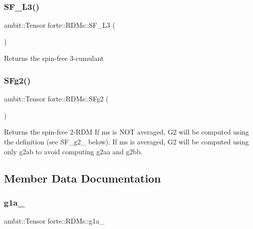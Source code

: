 \subsubsection{\texorpdfstring{S\+F\+\_\+\+L3()}{SF\_L3()}}
{\footnotesize\ttfamily ambit\+::\+Tensor forte\+::\+R\+D\+Ms\+::\+S\+F\+\_\+\+L3 (\begin{DoxyParamCaption}{ }\end{DoxyParamCaption})}

\begin{DoxyReturn}{Returns}
the spin-\/free 3-\/cumulant 
\end{DoxyReturn}
\mbox{\label{classforte_1_1_r_d_ms_a243bc245d6f69251fa4d4c39b895e19a}} 
\subsubsection{\texorpdfstring{S\+Fg2()}{SFg2()}}
{\footnotesize\ttfamily ambit\+::\+Tensor forte\+::\+R\+D\+Ms\+::\+S\+Fg2 (\begin{DoxyParamCaption}{ }\end{DoxyParamCaption})}

\begin{DoxyReturn}{Returns}
the spin-\/free 2-\/\+R\+DM If ms is N\+OT averaged, G2 will be computed using the definition (see S\+F\+\_\+g2\+\_\+ below). If ms is averaged, G2 will be computed using only g2ab to avoid computing g2aa and g2bb. 
\end{DoxyReturn}


\subsection{Member Data Documentation}
\mbox{\label{classforte_1_1_r_d_ms_af227a87cddd7ef6a1acfee7c797ee6bd}} 
\subsubsection{\texorpdfstring{g1a\+\_\+}{g1a\_}}
{\footnotesize\ttfamily ambit\+::\+Tensor forte\+::\+R\+D\+Ms\+::g1a\+\_\+\hspace{0.3cm}{\ttfamily [protected]}}



